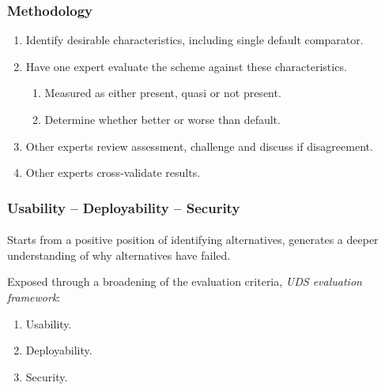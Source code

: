 \documentclass[handout, notes=hide]{beamer}
\begin{document}

\begin{frame}
\frametitle{Methodology}
\setlength{\parskip}{0.5em}

\begin{enumerate}
\item Identify desirable characteristics, including single default comparator.
\item Have one expert evaluate the scheme against these characteristics.
\begin{enumerate}
\item Measured as either present, quasi or not present.
\item Determine whether better or worse than default.
\end{enumerate}
\item Other experts review assessment, challenge and discuss if disagreement.
\item Other experts cross-validate results.
\end{enumerate}

\end{frame}


\begin{frame}
\frametitle{Usability -- Deployability -- Security}
\framesubtitle{}
\setlength{\parskip}{0.5em}

Starts from a positive position of identifying alternatives, generates a deeper understanding of why alternatives have failed.

Exposed through a broadening of the evaluation criteria, {\it UDS evaluation framework}:
\begin{enumerate}
\item Usability.
\item Deployability.
\item Security.
\end{enumerate}

\end{frame}
\note{
}

\end{document}
